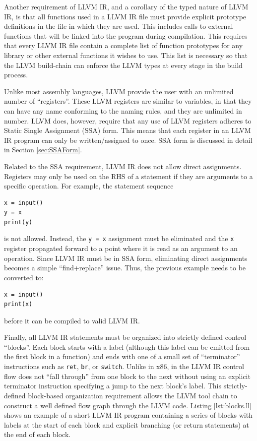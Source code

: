 \documentclass[11pt,twocolumn]{article}
\begin{document}
Another requirement of LLVM IR, and a corollary of the typed nature of
LLVM IR, is that all functions used in a LLVM IR file must provide
explicit prototype definitions in the file in which they are
used. This includes calls to external functions that will be linked
into the program during compilation. This requires that every LLVM IR
file contain a complete list of function prototypes for any library or
other external functions it wishes to use. This list is necessary so
that the LLVM build-chain can enforce the LLVM types at every stage in
the build process.


Unlike most assembly languages, LLVM provide the user with an unlimited
number of ``registers''. These LLVM registers are similar to
variables, in that they can have any name conforming to the naming
rules, and they are unlimited in number. LLVM does, however, require
that any use of LLVM registers adheres to Static Single Assignment
(SSA) form. This means that each register in an LLVM IR program can
only be written/assigned to once. SSA form is discussed in detail in
Section \ref{sec:SSAForm}.

Related to the SSA requirement, LLVM IR does not allow direct
assignments. Registers may only be used on the RHS of a statement if
they are arguments to a specific operation. For example, the statement
sequence
\begin{verbatim}
x = input()
y = x
print(y)
\end{verbatim} 
is not allowed. Instead, the \texttt{y = x} assignment must be
eliminated and the \texttt{x} register propagated forward to a point
where it is read as an argument to an operation. Since LLVM IR must be
in SSA form, eliminating direct assignments becomes a simple
``find+replace'' issue. Thus, the previous example needs to be
converted to:
\begin{verbatim}
x = input()
print(x)
\end{verbatim}
before it can be compiled to valid LLVM IR.

Finally, all LLVM IR statements must be organized into strictly
defined control ``blocks''. Each block starts with a label (although
this label can be emitted from the first block in a function) and ends
with one of a small set of ``terminator'' instructions such as
\texttt{ret}, \texttt{br}, or \texttt{switch}. Unlike in x86, in the
LLVM IR control flow does not ``fall through'' from one block to the
next without using an explicit terminator instruction specifying a
jump to the next block's label. This strictly-defined block-based
organization requirement allows the LLVM tool chain to construct a
well defined flow graph through the LLVM code. Listing
\ref{lst:blocks.ll} shows an example of a short LLVM IR program
containing a series of blocks with labels at the start of each block
and explicit branching (or return statements) at the end of each
block.
\end{document}
